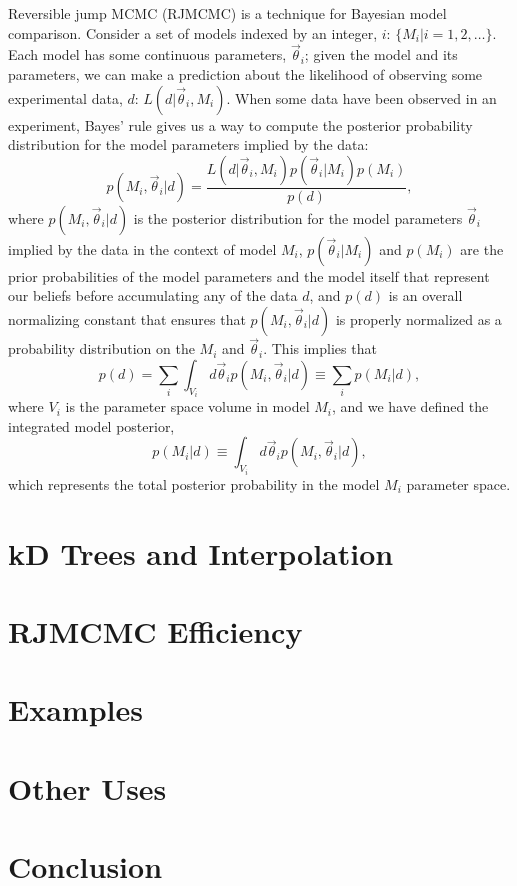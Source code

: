 \documentclass[prd,preprint]{revtex4}
\newcommand{\vtheta}{\vec{\theta}}
\begin{document}
Reversible jump MCMC (RJMCMC) \cite{Green1995} is a technique for
Bayesian model comparison.  Consider a set of models indexed by an
integer, $i$: $\{M_i | i = 1, 2, \ldots \}$.  Each model has some
continuous parameters, $\vtheta_i$; given the model and its
parameters, we can make a prediction about the likelihood of observing
some experimental data, $d$: $L(d|\vtheta_i, M_i)$.  When some data
have been observed in an experiment, Bayes' rule gives us a way to
compute the posterior probability distribution for the model
parameters implied by the data:
\begin{equation}
  p(M_i, \vtheta_i | d) = \frac{L(d|\vtheta_i, M_i) p(\vtheta_i|M_i) p(M_i)}{p(d)},
\end{equation}
where $p(M_i, \vtheta_i |d)$ is the posterior distribution for the
model parameters $\vtheta_i$ implied by the data in the context of
model $M_i$, $p(\vtheta_i|M_i)$ and $p(M_i)$ are the prior
probabilities of the model parameters and the model itself that
represent our beliefs before accumulating any of the data $d$, and
$p(d)$ is an overall normalizing constant that ensures that $p(M_i,
\vtheta_i|d)$ is properly normalized as a probability distribution on
the $M_i$ and $\vtheta_i$.  This implies that 
\begin{equation}
  p(d) = \sum_i \int_{V_i} d\vtheta_i p(M_i, \vtheta_i|d) \equiv
  \sum_i p(M_i|d),
\end{equation}
where $V_i$ is the parameter space volume in model $M_i$, and we have
defined the integrated model posterior, 
\begin{equation}
  p(M_i|d) \equiv \int_{V_i} d\vtheta_i p(M_i, \vtheta_i | d),
\end{equation}
which represents the total posterior probability in the model $M_i$
parameter space.





\section{kD Trees and Interpolation}

\section{RJMCMC Efficiency}

\section{Examples}

\section{Other Uses}

\section{Conclusion}

\nocite{Littenberg2009}


\end{document}
